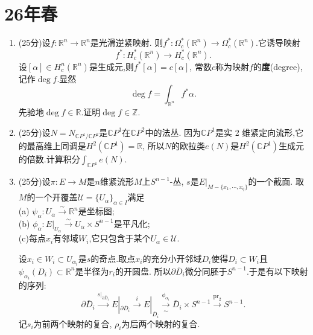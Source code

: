 
\section{26年春}
\begin{enumerate}
    \item[1.] (25分)设$f: \mathbb{R}^n\to\mathbb{R}^n$是光滑逆紧映射.
    则$f^*:\Omega_c^*(\mathbb{R}^n)\to\Omega_c^*(\mathbb{R}^n)$.它诱导映射
    \[f^*:H_c^*(\mathbb{R}^n)\to H_c^*(\mathbb{R}^n).\]
    设$[\alpha]\in H_c^n(\mathbb{R}^n)$是生成元,则$f^*[\alpha]=c[\alpha]$,
    常数$c$称为映射$f$的\textbf{度}(degree),记作$\operatorname{deg} f$.显然
    \[\operatorname{deg} f=\int_{\mathbb{R}^n}f^*\alpha.\]
    先验地$\operatorname{deg} f\in\mathbb{R}$.证明$\operatorname{deg} f\in\mathbb{Z}$.
    \item[2.] (25分)设$N=N_{\mathbb{C}P^1/\mathbb{C}P^2}$是$\mathbb{C}P^1$在$\mathbb{C}P^2$中的法丛.
    因为$\mathbb{C}P^1$是实 2 维紧定向流形,它的最高维上同调是$H^2(\mathbb{C}P^1)=\mathbb{R}$,
    所以$N$的欧拉类$e(N)$是$H^2(\mathbb{C}P^1)$生成元的倍数.计算积分$\int_{\mathbb{C}P^1}e(N)$.
    \item[3.] (25分)设$\pi:E\to M$是$n$维紧流形$M$上$S^{n-1}$-丛, $s$是$E|_{M-\{x_1,\cdots,x_q\}}$的一个截面.
    取$M$的一个开覆盖$\mathscr{U}=\{U_\alpha\}_{\alpha\in I}$满足\\
    (a) $\psi_\alpha:U_\alpha\xrightarrow{\sim}\mathbb{R}^n$是坐标图;\\
    (b) $\phi_\alpha:E|_{U_\alpha}\xrightarrow{\sim}U_\alpha\times S^{n-1}$是平凡化;\\
    (c)每点$x_i$有邻域$W_i$,它只包含于某个$U_\alpha\in\mathscr{U}$.

    设$x_i\in W_i\subset U_{\alpha_i}$是$s$的奇点.取点$x_i$的充分小开邻域$D_i$使得$D_i \subset W_i$且$\psi_{\alpha_i}(D_i)\subset\mathbb{R}^n$是半径为$r_i$的开圆盘.
    所以$\partial\bar{D}_i$微分同胚于$S^{n-1}$.于是有以下映射的序列:
    \[\partial\bar{D}_i\xrightarrow{s|_{\partial\bar{D}_i}}E|_{\partial\bar{D}_i}\xrightarrow{i}E|_{\bar{D}_i}\xrightarrow[\sim]{\phi_{\alpha_i}}\bar{D}_i\times S^{n-1}\xrightarrow{\text{pr}_2}S^{n-1}.\]
    记$s_i$为前两个映射的复合, $\rho_i$为后两个映射的复合.


\end{enumerate}
